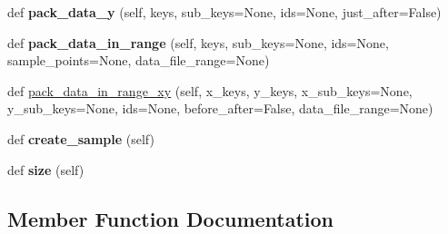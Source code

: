 \begin{DoxyCompactItemize}
def {\bfseries pack\+\_\+data\+\_\+y} (self, keys, sub\+\_\+keys=None, ids=None, just\+\_\+after=False)
\item 
\hypertarget{classaml__data__collec__utils_1_1core_1_1data__manager_1_1_data_manager_ab02da972553d3b3417e72e8888759193}{}\label{classaml__data__collec__utils_1_1core_1_1data__manager_1_1_data_manager_ab02da972553d3b3417e72e8888759193} 
def {\bfseries pack\+\_\+data\+\_\+in\+\_\+range} (self, keys, sub\+\_\+keys=None, ids=None, sample\+\_\+points=None, data\+\_\+file\+\_\+range=None)
\item 
def \hyperlink{classaml__data__collec__utils_1_1core_1_1data__manager_1_1_data_manager_a1afec102117b34b11d170594543439f8}{pack\+\_\+data\+\_\+in\+\_\+range\+\_\+xy} (self, x\+\_\+keys, y\+\_\+keys, x\+\_\+sub\+\_\+keys=None, y\+\_\+sub\+\_\+keys=None, ids=None, before\+\_\+after=False, data\+\_\+file\+\_\+range=None)
\item 
\hypertarget{classaml__data__collec__utils_1_1core_1_1data__manager_1_1_data_manager_a0726ea619d947ce908167ed818de16d3}{}\label{classaml__data__collec__utils_1_1core_1_1data__manager_1_1_data_manager_a0726ea619d947ce908167ed818de16d3} 
def {\bfseries create\+\_\+sample} (self)
\item 
\hypertarget{classaml__data__collec__utils_1_1core_1_1data__manager_1_1_data_manager_adde3cc9ccbf385a50d0dfe610185e417}{}\label{classaml__data__collec__utils_1_1core_1_1data__manager_1_1_data_manager_adde3cc9ccbf385a50d0dfe610185e417} 
def {\bfseries size} (self)
\end{DoxyCompactItemize}


\subsection{Member Function Documentation}
\hypertarget{classaml__data__collec__utils_1_1core_1_1data__manager_1_1_data_manager_a1afec102117b34b11d170594543439f8}{}\label{classaml__data__collec__utils_1_1core_1_1data__manager_1_1_data_manager_a1afec102117b34b11d170594543439f8} 
